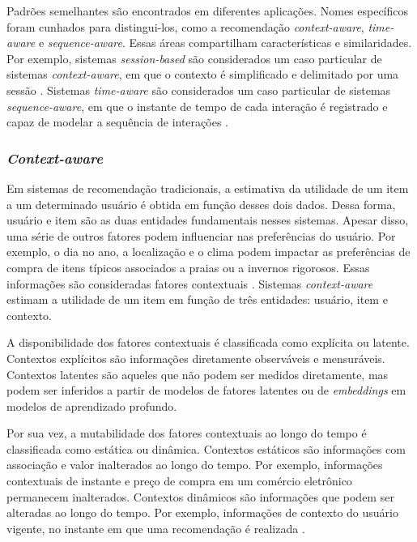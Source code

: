 Padrões semelhantes são encontrados em diferentes aplicações. Nomes específicos
foram cunhados para distingui-los, como a recomendação \textit{context-aware},
\textit{time-aware} e \textit{sequence-aware}. Essas áreas compartilham
características e similaridades. Por exemplo, sistemas \textit{session-based}
são considerados um caso particular de sistemas \textit{context-aware}, em que o
contexto é simplificado e delimitado por uma sessão \cite{survey_wang_2021}.
Sistemas \textit{time-aware} são considerados um caso particular de sistemas
\textit{sequence-aware}, em que o instante de tempo de cada interação é
registrado e capaz de modelar a sequência de interações
\cite{ludewig2020advances}.

\subsubsection{\textit{Context-aware}} 

Em sistemas de recomendação tradicionais, a estimativa da utilidade de um item a
um determinado usuário é obtida em função desses dois dados. Dessa forma,
usuário e item são as duas entidades fundamentais nesses sistemas. Apesar disso,
uma série de outros fatores podem influenciar nas preferências do usuário. Por
exemplo, o dia no ano, a localização e o clima podem impactar as preferências de
compra de itens típicos associados a praias ou a invernos rigorosos. Essas
informações são consideradas fatores contextuais \cite{rec_sys_handbook_2022_context}.
Sistemas \textit{context-aware} estimam a utilidade de um item em função de três
entidades: usuário, item e contexto.

A disponibilidade dos fatores contextuais é classificada como explícita ou
latente. Contextos explícitos são informações diretamente observáveis e
mensuráveis. Contextos latentes são aqueles que não podem ser medidos
diretamente, mas podem ser inferidos a partir de modelos de fatores latentes ou
de \textit{embeddings} em modelos de aprendizado profundo.

Por sua vez, a mutabilidade dos fatores contextuais ao longo do tempo é
classificada como estática ou dinâmica. Contextos estáticos são informações com
associação e valor inalterados ao longo do tempo. Por exemplo, informações
contextuais de instante e preço de compra em um comércio eletrônico permanecem
inalterados. Contextos dinâmicos são informações que podem ser alteradas ao
longo do tempo. Por exemplo, informações de contexto do usuário vigente, no
instante em que uma recomendação é realizada
\cite{rec_sys_handbook_2022_context}.

